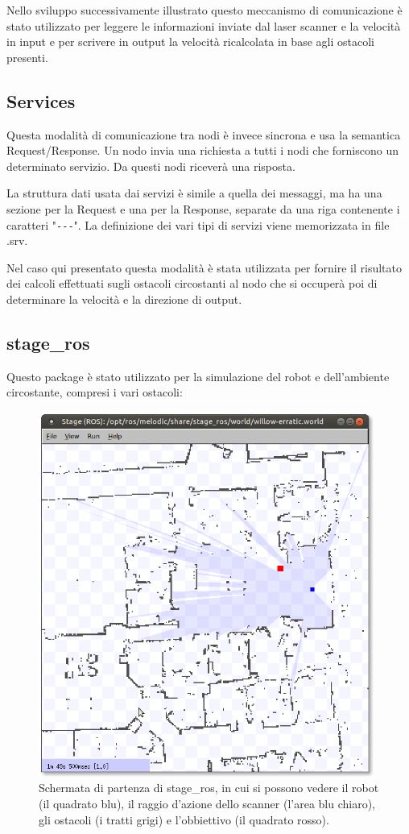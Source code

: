 \documentclass[Lau, binding=0.6cm, oneside]{sapthesis}
\begin{document}
Nello sviluppo successivamente illustrato questo meccanismo di comunicazione è stato utilizzato per leggere le informazioni inviate dal laser scanner e la velocità in input e per scrivere in output la velocità ricalcolata in base agli ostacoli presenti.

\subsection{Services}
Questa modalità di comunicazione tra nodi è invece sincrona e usa la semantica Request/Response.
Un nodo invia una richiesta a tutti i nodi che forniscono un determinato servizio.
Da questi nodi riceverà una risposta.

La struttura dati usata dai servizi è simile a quella dei messaggi, ma ha una sezione per la Request e una per la Response, separate da una riga contenente i caratteri "\lstinline{---}".
La definizione dei vari tipi di servizi viene memorizzata in file .srv.

Nel caso qui presentato questa modalità è stata utilizzata per fornire il risultato dei calcoli effettuati sugli ostacoli circostanti al nodo che si occuperà poi di determinare la velocità e la direzione di output.

\subsection{stage\_ros}
Questo package è stato utilizzato per la simulazione del robot e dell'ambiente circostante, compresi i vari ostacoli:

\begin{figure}[H]
    \centering
    \includegraphics[width=11cm]{stage_ros.png}
    \caption{Schermata di partenza di stage\_ros, in cui si possono vedere il robot (il quadrato blu), il raggio d'azione dello scanner (l'area blu chiaro), gli ostacoli (i tratti grigi) e l'obbiettivo (il quadrato rosso).}
    \label{fig:stage_ros}
\end{figure}
\end{document}
